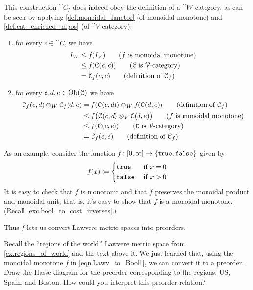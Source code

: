 \documentclass[7Sketches]{subfiles}
\begin{document}
This construction $\cat{C}_f$ does indeed obey the definition of a
$\cat{W}$-category, as can be seen by applying
\cref{def.monoidal_functor} (of monoidal monotone) and \cref{def.cat_enriched_mpos}
(of $\cat{V}$-category):
\begin{enumerate}[label=(\alph*)]
	\item for every $c\in\cat{C}$, we have
	  \begin{align*}
	    I_W &\leq f(I_V) \tag{$f$ is monoidal monotone}\\
	    &\leq f(\cat{C}(c,c)) \tag{$\cat{C}$ is $\cat{V}$-category}\\
	    &=\cat{C}_f(c,c) \tag{definition of $\cat{C}_f$}
	  \end{align*}
	\item for every $c,d,e\in\operatorname{Ob}(\mathcal{C})$ we have
	\begin{align*}
		\cat{C}_f(c,d)\otimes_W\cat{C}_f(d,e)&=f(\cat{C}(c,d))\otimes_Wf(\cat{C}(d,e))
		\tag{definition of $\cat{C}_f$}\\
		&\leq f\big(\cat{C}(c,d)\otimes_V\cat{C}(d,e)\big)
		\tag{$f$ is monoidal monotone}\\
		&\leq f(\cat{C}(c,e))
		\tag{$\cat{C}$ is $\cat{V}$-category}\\
		&=\cat{C}_f(c,e)
		\tag{definition of $\cat{C}_f$}
	\end{align*}
\end{enumerate}

\begin{example}
As an example, consider the function $f\colon[0,\infty]\to\{\mathtt{true},\mathtt{false}\}$ given by
\begin{equation}%
\label{eqn.Lawv_to_Bool1}
	f(x)\coloneqq
	\begin{cases}
		\true&\tn{ if }x=0\\
		\false&\tn{ if }x>0
	\end{cases}
\end{equation}
It is easy to check that $f$ is monotonic and that $f$ preserves the monoidal
product and monoidal unit; that is, it's easy to show that $f$ is a monoidal
monotone. (Recall \cref{exc.bool_to_cost_inverses}.)

Thus $f$ lets us convert Lawvere metric spaces into preorders.%
\end{example}

\begin{exercise} %
\label{exc.regions_preorder}
Recall the ``regions of the world'' Lawvere metric space from
\cref{ex.regions_of_world} and the text above it. We just learned that, using
the monoidal monotone $f$ in \cref{eqn.Lawv_to_Bool1},  we can convert it to a
preorder. Draw the Hasse diagram for the preorder corresponding to the regions:
US, Spain, and Boston. How could you interpret this preorder relation?
\end{exercise}
\end{document}
